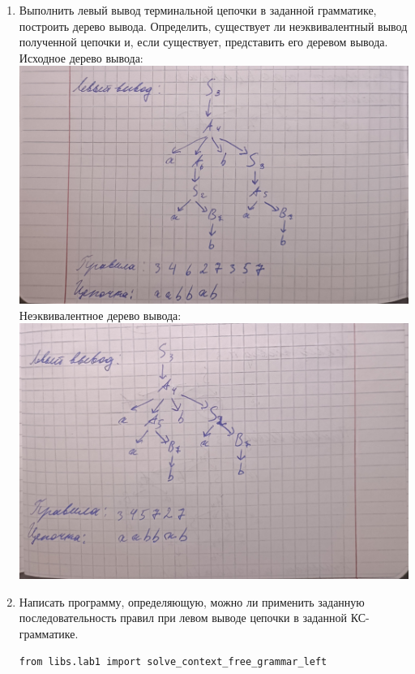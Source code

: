 \documentclass[a4paper,14pt]{extarticle}
\begin{document}
\begin{enumerate}[1.]
    \item Выполнить левый вывод терминальной цепочки в заданной грамматике, построить дерево вывода.
          Определить, существует ли неэквивалентный вывод полученной цепочки и, если существует, представить его деревом вывода.\bigbreak
          Исходное дерево вывода:\\
          \includegraphics[width=140mm]{task2_origin}\\
          Неэквивалентное дерево вывода:\\
          \includegraphics[width=140mm]{task2_alternative}\\




          \item Написать программу, определяющую, можно ли применить 
          заданную последовательность правил при левом выводе 
          цепочки в заданной КС-грамматике.
          \begin{verbatim}
from libs.lab1 import solve_context_free_grammar_left


\end{verbatim}
\end{enumerate}
\end{document}
